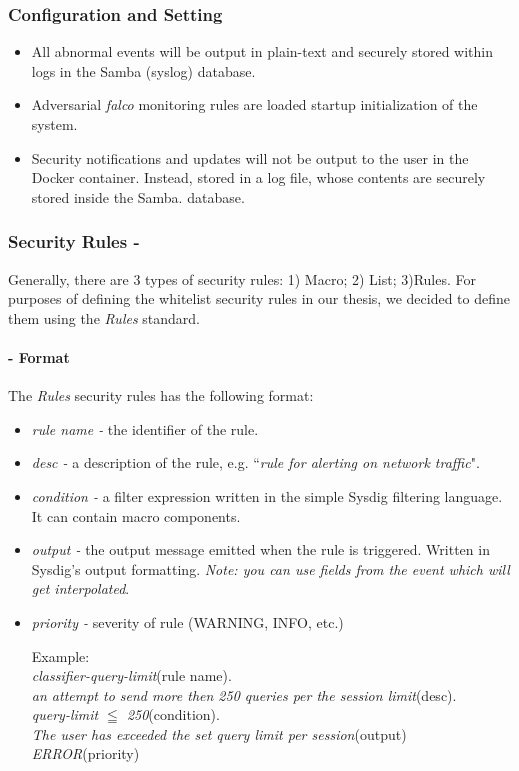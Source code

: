 \documentclass[grad,lot,lof,11pt,oneside,onehalfspace]{RUthesis}
\begin{document}
\subsubsection{Configuration and  Setting}
\begin{itemize}
	\item All abnormal events will be output in plain-text and securely stored within logs in the Samba (syslog) database.
	\item Adversarial \textit{falco} monitoring rules are loaded startup initialization of the system.  
	\item  Security notifications and updates will not be output to the user in the Docker container. Instead, stored in a log file, whose contents are securely stored  inside the Samba.  database. 	
\end{itemize}
\subsubsection{Security Rules -}
Generally, there are 3 types of security rules: 1) Macro; 2) List; 3)Rules. For purposes of defining the whitelist security rules in our thesis, we decided to define them using the \textit{Rules} standard. 
\paragraph{- Format}
The \textit{Rules} security rules has the following format:
\begin{itemize}
	\item \textit{rule name -} the identifier of the rule.
	\item \textit{desc - } a description of the rule, e.g. “\textit{rule for alerting on network traffic}".
	\item \textit{condition -}  a filter expression written in the simple Sysdig filtering language. It can contain macro components.
	\item \textit{output -} the output message emitted when the rule is triggered. Written in Sysdig’s output formatting. \textit{Note: you can use fields from the event which will get interpolated}.
	\item \textit{priority -} severity of rule (WARNING, INFO, etc.)

	Example:\\
	\textit{classifier-query-limit}(rule name).\\
	\textit{an attempt to send more then 250 queries per the session limit}(desc).\\ 
	\textit{query-limit $\leqq$ 250}(condition).\\
	\textit{The user has exceeded the set query limit per session}(output)\\
	\textit{ERROR}(priority)\\
\end{itemize}
\end{document}
